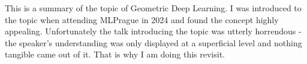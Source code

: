 This is a summary of the topic of Geometric Deep Learning. I was introduced to the topic when attending MLPrague in 2024 and found the concept highly appealing. Unfortunately the talk introducing the topic was utterly horrendous - the speaker's understanding was only displayed at a superficial level and nothing tangible came out of it. That is why I am doing this revisit.
